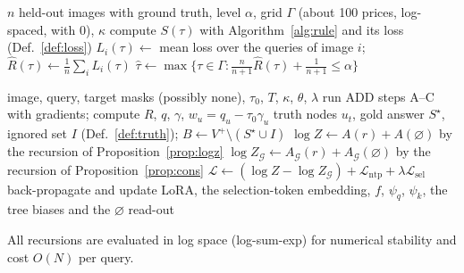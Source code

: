 \documentclass[11pt,a4paper]{article}
\theoremstyle{definition}
\theoremstyle{remark}
\newcommand{\nul}{\varnothing}
\newcommand{\cG}{\mathcal{G}}
\begin{document}
\begin{algorithm}[H]
\caption{Calibration of the price}\label{alg:calib}
\begin{algorithmic}[1]
\Require $n$ held-out images with ground truth, level $\alpha$, grid $\Gamma$ (about 100 prices, log-spaced, with $0$), $\kappa$
  \State compute $S(\tau)$ with Algorithm~\ref{alg:rule} and its loss (Def.~\ref{def:loss})
\EndFor
\State $L_i(\tau)\gets$ mean loss over the queries of image $i$; \ $\hat R(\tau)\gets\frac1n\sum_iL_i(\tau)$
\State \Return $\hat\tau\gets\max\{\tau\in\Gamma:\frac{n}{n+1}\hat R(\tau)+\frac1{n+1}\le\alpha\}$
\end{algorithmic}
\end{algorithm}

\begin{algorithm}[H]
\caption{One training step for one query}\label{alg:train}
\begin{algorithmic}[1]
\Require image, query, target masks (possibly none), $\tau_0$, $T$, $\kappa$, $\theta$, $\lambda$
\State run ADD steps A--C with gradients; compute $R$, $q$, $\gamma$, $w_u=q_u-\tau_0\gamma_u$
\State truth nodes $u_t$, gold answer $S^\star$, ignored set $I$ (Def.~\ref{def:truth}); $B\gets V^+\setminus(S^\star\cup I)$
\State $\log Z\gets A(r)+A(\nul)$ by the recursion of Proposition~\ref{prop:logz}
\State $\log Z_\cG\gets A_\cG(r)+A_\cG(\nul)$ by the recursion of Proposition~\ref{prop:cons}
\State $\mathcal{L}\gets(\log Z-\log Z_\cG)+\mathcal{L}_{\mathrm{ntp}}+\lambda\mathcal{L}_{\mathrm{sel}}$
\State back-propagate and update LoRA, the selection-token embedding, $f$, $\psi_q$, $\psi_k$, the tree biases and the $\nul$ read-out
\end{algorithmic}
\end{algorithm}
All recursions are evaluated in log space (log-sum-exp) for numerical stability and cost $O(N)$ per query.

\end{document}
